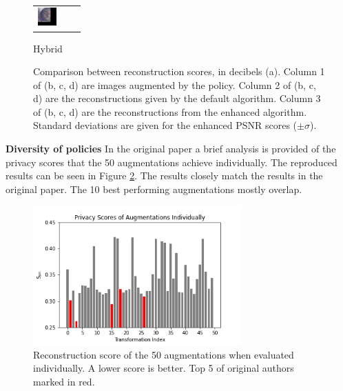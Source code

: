 \begin{figure}[h]
\begin{subtable}{.11\linewidth}
{\begin{tabular}{ l l l }
   \includegraphics[width = 20pt]{enhimagesHybrid/rec_91.jpg} \\
\end{tabular}}
\caption{Hybrid}%
\end{subtable}%
\endgroup
\caption{Comparison between reconstruction scores, in decibels (a). Column 1 of (b, c, d) are images augmented by the policy. Column 2 of (b, c, d) are the reconstructions given by the default algorithm. Column 3 of (b, c, d) are the reconstructions from the enhanced algorithm. Standard deviations are given for the enhanced PSNR scores ($\pm \sigma$).}
    \label{fig:attack}
\end{figure}

\textbf{Diversity of policies}
In the original paper a brief analysis is provided of the privacy scores that the 50 augmentations achieve individually. The reproduced results can be seen in Figure \ref{fig:individual}. The results closely match the results in the original paper. The 10 best performing augmentations mostly overlap.

\begin{figure}[htp]
    \centering
    \includegraphics[width=8cm]{pics/policy_reconstruction_individual_fixed.png}
    \caption{Reconstruction score of the 50 augmentations when evaluated individually. A lower score is better. Top 5 of original authors marked in red.}
    \label{fig:individual}
\end{figure}

